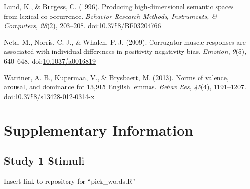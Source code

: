\documentclass[man]{apa6}
\begin{document}
\leavevmode\hypertarget{ref-lund_producing_1996}{}%
Lund, K., \& Burgess, C. (1996). Producing high-dimensional semantic spaces from lexical co-occurrence. \emph{Behavior Research Methods, Instruments, \& Computers}, \emph{28}(2), 203--208. doi:\href{https://doi.org/10.3758/BF03204766}{10.3758/BF03204766}

\leavevmode\hypertarget{ref-neta_corrugator_2009}{}%
Neta, M., Norris, C. J., \& Whalen, P. J. (2009). Corrugator muscle responses are associated with individual differences in positivity-negativity bias. \emph{Emotion}, \emph{9}(5), 640--648. doi:\href{https://doi.org/10.1037/a0016819}{10.1037/a0016819}

\leavevmode\hypertarget{ref-warriner_norms_2013}{}%
Warriner, A. B., Kuperman, V., \& Brysbaert, M. (2013). Norms of valence, arousal, and dominance for 13,915 English lemmas. \emph{Behav Res}, \emph{45}(4), 1191--1207. doi:\href{https://doi.org/10.3758/s13428-012-0314-x}{10.3758/s13428-012-0314-x}

\endgroup

\newpage

\hypertarget{supplementary-information}{%
\section{Supplementary Information}\label{supplementary-information}}

\hypertarget{study-1-stimuli}{%
\subsection{Study 1 Stimuli}\label{study-1-stimuli}}

Insert link to repository for \enquote{pick\_words.R}
\end{document}
